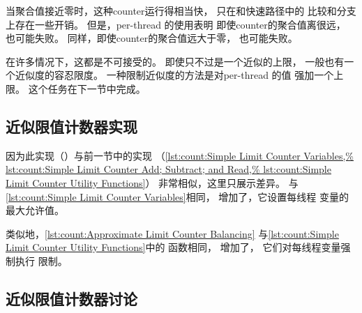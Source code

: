 当聚合值接近零时，这种counter运行得相当快，
只在和快速路径中的
比较和分支上存在一些开销。
但是，per-thread 的使用表明
即使counter的聚合值离很远，
也可能失败。
同样，即使counter的聚合值远大于零，
也可能失败。

在许多情况下，这都是不可接受的。
即使只不过是一个近似的上限，
一般也有一个近似度的容忍限度。
一种限制近似度的方法是对per-thread 的值
强加一个上限。
这个任务在下一节中完成。

\subsection{近似限值计数器实现}
\label{sec:count:Approximate Limit Counter Implementation}

因为此实现（）与前一节中的实现
（\cref{lst:count:Simple Limit Counter Variables,%
lst:count:Simple Limit Counter Add; Subtract; and Read,%
lst:count:Simple Limit Counter Utility Functions}）
非常相似，这里只展示差异。
与\cref{lst:count:Simple Limit Counter Variables}相同，
增加了，它设置每线程
变量的最大允许值。

\begin{listing}

\caption{Approximate Limit Counter变量}
\label{lst:count:Approximate Limit Counter Variables}
\end{listing}

\begin{listing}

\caption{Approximate Limit Counter平衡}
\label{lst:count:Approximate Limit Counter Balancing}
\end{listing}

\begin{fcvref}
类似地，\cref{lst:count:Approximate Limit Counter Balancing}
与\cref{lst:count:Simple Limit Counter Utility Functions}中的
函数相同，
增加了，
它们对每线程变量强制执行
限制。
\end{fcvref}

\subsection{近似限值计数器讨论}

